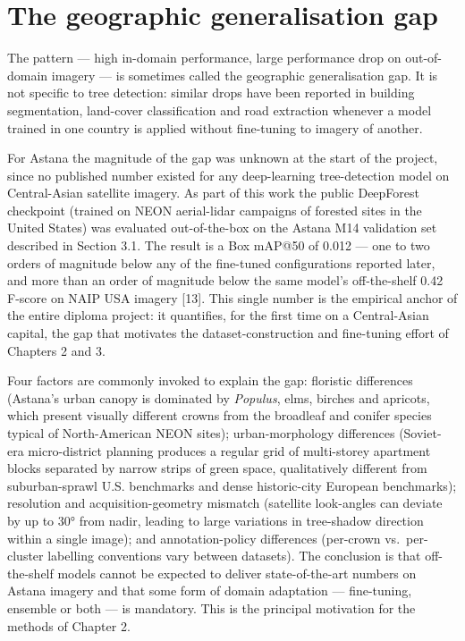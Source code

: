 \section{The geographic generalisation gap}\label{the-geographic-generalisation-gap}

The pattern --- high in-domain performance, large performance drop on out-of-domain imagery --- is sometimes called the geographic generalisation gap. It is not specific to tree detection: similar drops have been reported in building segmentation, land-cover classification and road extraction whenever a model trained in one country is applied without fine-tuning to imagery of another.

For Astana the magnitude of the gap was unknown at the start of the project, since no published number existed for any deep-learning tree-detection model on Central-Asian satellite imagery. As part of this work the public DeepForest checkpoint (trained on NEON aerial-lidar campaigns of forested sites in the United States) was evaluated out-of-the-box on the Astana M14 validation set described in Section 3.1. The result is a Box mAP@50 of 0.012 --- one to two orders of magnitude below any of the fine-tuned configurations reported later, and more than an order of magnitude below the same model's off-the-shelf 0.42 F-score on NAIP USA imagery {[}13{]}. This single number is the empirical anchor of the entire diploma project: it quantifies, for the first time on a Central-Asian capital, the gap that motivates the dataset-construction and fine-tuning effort of Chapters 2 and 3.

Four factors are commonly invoked to explain the gap: floristic differences (Astana's urban canopy is dominated by \emph{Populus}, elms, birches and apricots, which present visually different crowns from the broadleaf and conifer species typical of North-American NEON sites); urban-morphology differences (Soviet-era micro-district planning produces a regular grid of multi-storey apartment blocks separated by narrow strips of green space, qualitatively different from suburban-sprawl U.S. benchmarks and dense historic-city European benchmarks); resolution and acquisition-geometry mismatch (satellite look-angles can deviate by up to 30° from nadir, leading to large variations in tree-shadow direction within a single image); and annotation-policy differences (per-crown vs.~per-cluster labelling conventions vary between datasets). The conclusion is that off-the-shelf models cannot be expected to deliver state-of-the-art numbers on Astana imagery and that some form of domain adaptation --- fine-tuning, ensemble or both --- is mandatory. This is the principal motivation for the methods of Chapter 2.

